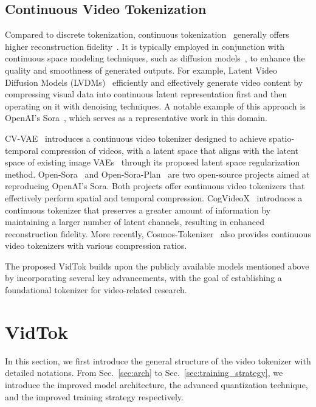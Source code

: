 \documentclass{article} %
\begin{document}
\subsection{Continuous Video Tokenization}

Compared to discrete tokenization, continuous tokenization~\citep{zhao2024cv,repoopensora,chen2024od,yang2024cogvideox,repocosmos} generally offers higher reconstruction fidelity~\citep{rombach2022high}. It is typically employed in conjunction with continuous space modeling techniques, such as diffusion models~\citep{ho2020denoising}, to enhance the quality and smoothness of generated outputs. For example, Latent Video Diffusion Models (LVDMs)~\citep{blattmann2023stable,guo2023animatediff,yang2024cogvideox,sora} efficiently and effectively generate video content by compressing visual data into continuous latent representation first and then operating on it with denoising techniques. A notable example of this approach is OpenAI’s Sora~\citep{sora}, which serves as a representative work in this domain.

CV-VAE~\citep{zhao2024cv} introduces a continuous video tokenizer designed to achieve spatio-temporal compression of videos, with a latent space that aligns with the latent space of existing image VAEs~\citep{rombach2022high} through its proposed latent space regularization method. Open-Sora~\citep{repoopensora} and Open-Sora-Plan~\citep{repoopensoraplan,chen2024od} are two open-source projects aimed at reproducing OpenAI’s Sora. Both projects offer continuous video tokenizers that effectively perform spatial and temporal compression. CogVideoX~\citep{yang2024cogvideox} introduces a continuous tokenizer that preserves a greater amount of information by maintaining a larger number of latent channels, resulting in enhanced reconstruction fidelity. More recently, Cosmos-Tokenizer~\citep{repocosmos} also provides continuous video tokenizers with various compression ratios.

The proposed VidTok builds upon the publicly available models mentioned above by incorporating several key advancements, with the goal of establishing a foundational tokenizer for video-related research.


\section{VidTok}
\label{sec:method}

In this section, we first introduce the general structure of the video tokenizer with detailed notations. From Sec.~\ref{sec:arch} to Sec.~\ref{sec:training_strategy}, we introduce the improved model architecture, the advanced quantization technique, and the improved training strategy respectively.
\end{document}

